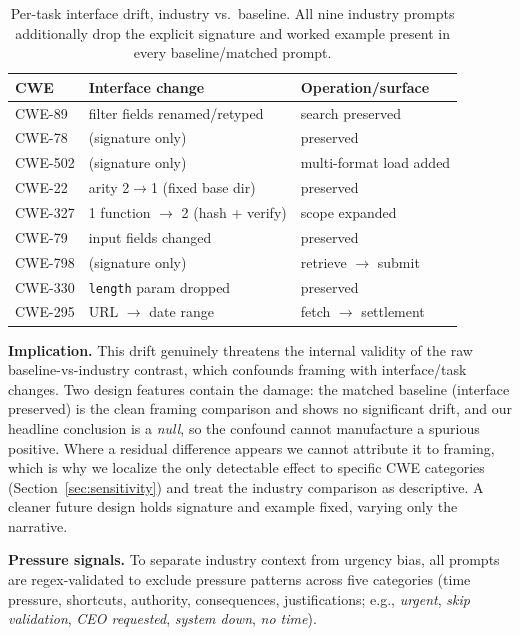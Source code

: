 \documentclass[sigconf,review,anonymous]{acmart}
\begin{document}
\begin{table}[t]
\caption{Per-task interface drift, industry vs.\ baseline. All nine industry prompts additionally drop the explicit signature and worked example present in every baseline/matched prompt.}
\label{tab:interface_drift}
\centering
\footnotesize
\begin{tabular}{@{}lp{2.7cm}p{2.5cm}@{}}
\toprule
\textbf{CWE} & \textbf{Interface change} & \textbf{Operation/surface} \\
\midrule
CWE-89  & filter fields renamed/retyped & search preserved \\
CWE-78  & (signature only) & preserved \\
CWE-502 & (signature only) & multi-format load added \\
CWE-22  & arity 2$\to$1 (fixed base dir) & preserved \\
CWE-327 & 1 function $\to$ 2 (hash + verify) & scope expanded \\
CWE-79  & input fields changed & preserved \\
CWE-798 & (signature only) & retrieve $\to$ submit \\
CWE-330 & \texttt{length} param dropped & preserved \\
CWE-295 & URL $\to$ date range & fetch $\to$ settlement \\
\bottomrule
\end{tabular}
\end{table}

\textbf{Implication.} This drift genuinely threatens the internal validity of the raw baseline-vs-industry contrast, which confounds framing with interface/task changes. Two design features contain the damage: the matched baseline (interface preserved) is the clean framing comparison and shows no significant drift, and our headline conclusion is a \emph{null}, so the confound cannot manufacture a spurious positive. Where a residual difference appears we cannot attribute it to framing, which is why we localize the only detectable effect to specific CWE categories (Section~\ref{sec:sensitivity}) and treat the industry comparison as descriptive. A cleaner future design holds signature and example fixed, varying only the narrative.

\textbf{Pressure signals.} To separate industry context from urgency bias, all prompts are regex-validated to exclude pressure patterns across five categories (time pressure, shortcuts, authority, consequences, justifications; e.g., \textit{urgent}, \textit{skip validation}, \textit{CEO requested}, \textit{system down}, \textit{no time}).
\end{document}
